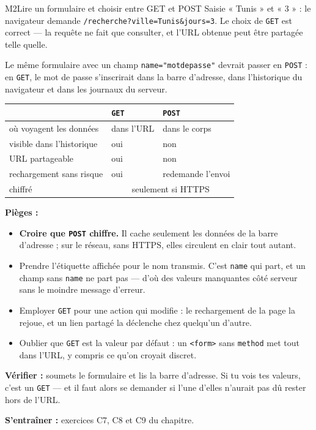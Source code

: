 \begin{fichemethode}{M2}{Lire un formulaire et choisir entre GET et POST}
Saisie « Tunis » et « 3 » : le navigateur demande
\lstinline{/recherche?ville=Tunis&jours=3}. Le choix de \lstinline{GET} est correct — la
requête ne fait que consulter, et l'URL obtenue peut être partagée telle quelle.

Le même formulaire avec un champ \lstinline{name="motdepasse"} devrait passer en
\lstinline{POST} : en \lstinline{GET}, le mot de passe s'inscrirait dans la barre d'adresse,
dans l'historique du navigateur et dans les journaux du serveur.

\begin{center}
\begin{tabular}{l|l|l}
& \texttt{GET} & \texttt{POST} \\
\hline
où voyagent les données & dans l'URL & dans le corps \\
visible dans l'historique & oui & non \\
URL partageable & oui & non \\
rechargement sans risque & oui & redemande l'envoi \\
chiffré & \multicolumn{2}{c}{seulement si HTTPS} \\
\end{tabular}
\end{center}

\textbf{Pièges :}
\begin{itemize}
  \item \textbf{Croire que \lstinline{POST} chiffre.} Il cache seulement les données de la
    barre d'adresse ; sur le réseau, sans HTTPS, elles circulent en clair tout autant.
  \item Prendre l'étiquette affichée pour le nom transmis. C'est \lstinline{name} qui part,
    et un champ sans \lstinline{name} ne part pas — d'où des valeurs manquantes côté serveur
    sans le moindre message d'erreur.
  \item Employer \lstinline{GET} pour une action qui modifie : le rechargement de la page la
    rejoue, et un lien partagé la déclenche chez quelqu'un d'autre.
  \item Oublier que \lstinline{GET} est la valeur par défaut : un \lstinline{<form>} sans
    \lstinline{method} met tout dans l'URL, y compris ce qu'on croyait discret.
\end{itemize}

\textbf{Vérifier :} soumets le formulaire et lis la barre d'adresse. Si tu vois tes valeurs,
c'est un \lstinline{GET} — et il faut alors se demander si l'une d'elles n'aurait pas dû
rester hors de l'URL.

\textbf{S'entraîner :} exercices C7, C8 et C9 du chapitre.
\end{fichemethode}
